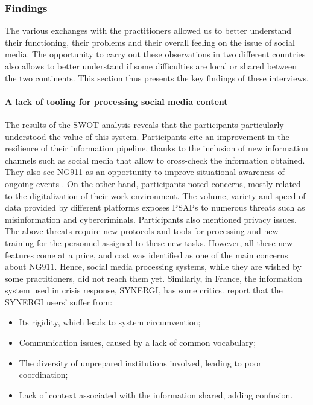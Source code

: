 \subsubsection{Findings}
The various exchanges with the practitioners allowed us to better understand their functioning, their problems and their overall feeling on the issue of social media.
The opportunity to carry out these observations in two different countries also allows to better understand if some difficulties are local or shared between the two continents.
This section thus presents the key findings of these interviews.

\paragraph{A lack of tooling for processing social media content}
The results of the SWOT analysis reveals that the participants particularly understood the value of this system.
Participants cite an improvement in the resilience of their information pipeline, thanks to the inclusion of new information channels such as social media that allow to cross-check the information obtained.
They also see NG911 as an opportunity to improve situational awareness of ongoing events .
On the other hand, participants noted concerns, mostly related to the digitalization of their work environment.
The volume, variety and speed of data provided by different platforms exposes PSAPs to numerous threats such as misinformation and cybercriminals.
Participants also mentioned privacy issues.
The above threats require new protocols and tools for processing and new training for the personnel assigned to these new tasks.
However, all these new features come at a price, and cost was identified as one of the main concerns about NG911.
Hence, social media processing systems, while they are wished by some practitioners, did not reach them yet.
Similarly, in France, the information system used in crisis response, SYNERGI, has some critics.
\textcite{linotPerspectiveComputationnelleDefi2018} report that the SYNERGI users' suffer from:

\begin{itemize}
    \item Its rigidity, which leads to system circumvention;
    \item Communication issues, caused by a lack of common vocabulary;
    \item The diversity of unprepared institutions involved, leading to poor coordination;
    \item Lack of context associated with the information shared, adding confusion.
\end{itemize}

